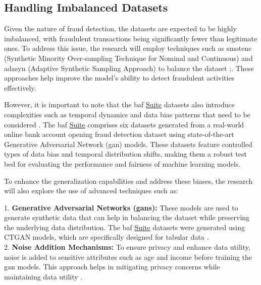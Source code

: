 \documentclass[12pt,a4paper]{report}
\begin{document}
\subsection{Handling Imbalanced Datasets}
Given the nature of fraud detection, the datasets are expected to be highly imbalanced, with fraudulent transactions being significantly fewer than legitimate ones. To address this issue, the research will employ techniques such as \acrshort{smotenc} (Synthetic Minority Over-sampling Technique for Nominal and Continuous) and \acrshort{adasyn} (Adaptive Synthetic Sampling Approach) to balance the dataset \citep{chawla2002smote};\citep{he2008adasyn}. These approaches help improve the model's ability to detect fraudulent activities effectively.

However, it is important to note that the \acrshort{baf} \href{https://www.kaggle.com/datasets/sgpjesus/bank-account-fraud-dataset-neurips-2022/code}{Suite} datasets also introduce complexities such as temporal dynamics and data bias patterns that need to be considered \citep{jesus2022turning}. The \acrshort{baf} \href{https://www.kaggle.com/datasets/sgpjesus/bank-account-fraud-dataset-neurips-2022/code}{Suite} comprises six datasets generated from a real-world online bank account opening fraud detection dataset using state-of-the-art Generative Adversarial Network (\acrshort{gan}) models. These datasets feature controlled types of data bias and temporal distribution shifts, making them a robust test bed for evaluating the performance and fairness of machine learning models.

To enhance the generalization capabilities and address these biases, the research will also explore the use of advanced techniques such as:

1. \textbf{Generative Adversarial Networks (\acrshort{gan}s):} These models are used to generate synthetic data that can help in balancing the dataset while preserving the underlying data distribution. The \acrshort{baf} \href{https://www.kaggle.com/datasets/sgpjesus/bank-account-fraud-dataset-neurips-2022/code}{Suite} datasets were generated using CTGAN models, which are specifically designed for tabular data \citep{xu2019modeling}.\\

2. \textbf{Noise Addition Mechanisms:} To ensure privacy and enhance data utility, noise is added to sensitive attributes such as age and income before training the \acrshort{gan} models. This approach helps in mitigating privacy concerns while maintaining data utility \citep{dwork2016calibrating}.\\
\end{document}
